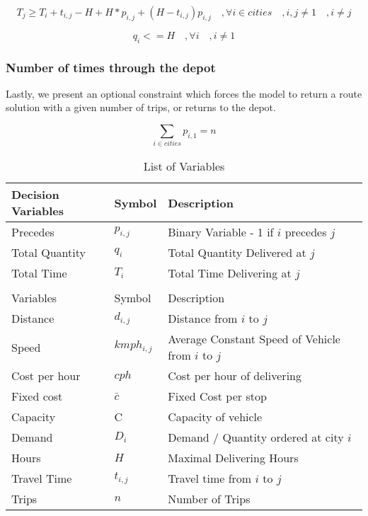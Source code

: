 \documentclass[a4paper,11pt]{article}
\begin{document}
\begin{equation}\label{incT}
T_{j} \geq T_{i} + t_{i,j} - H + H*p_{i,j}  + (H -  t_{i,j})p_{i,j} \quad, \forall i \in cities\quad, i,j \neq 1 \quad, i\neq j
\end{equation}

\begin{equation}\label{leqT}
q_{i} <= H \quad, \forall i\quad, i\neq1
\end{equation}


\subsubsection{Number of times through the depot}
Lastly, we present an optional constraint which forces the model to return a route solution with a given number of trips, or returns to the depot.

\begin{equation}\label{eq13}
\sum\limits_{i \in cities} p_{i,1} = n
\end{equation}

\begin{table}[h!]
\centering
\caption{List of Variables}
\label{variables}
\begin{tabular}{lll}
\hline
Decision Variables & Symbol & Description \\
\hline
\hline
Precedes & $p_{i,j}$  & Binary Variable - 1 if $i$ precedes $j$\\
Total Quantity & $q_{i}$ & Total Quantity Delivered at $j$ \\
Total Time & $T_{i}$ & Total Time Delivering at $j$ \\ 
\\
\hline
Variables & Symbol & Description \\
\hline
\hline
Distance & $d_{i,j}$ & Distance from $i$ to $j$  \\
Speed & $kmph_{i,j}$ & Average Constant Speed of Vehicle from $i$ to $j$\\
Cost per hour & $cph$ & Cost per hour of delivering \\ 
Fixed cost & $\bar{c}$ & Fixed Cost per stop \\
Capacity & C & Capacity of vehicle \\ 
Demand & $D_{i}$ & Demand / Quantity ordered at city $i$ \\  
Hours & $H$ & Maximal Delivering Hours \\
Travel Time & $t_{i,j}$ & Travel time from $i$ to $j$ \\ 
Trips & $n$ & Number of Trips \\
\end{tabular}
\end{table}
\end{document}
